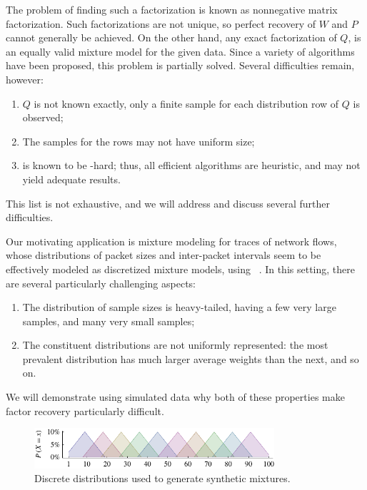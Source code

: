 \documentclass[conference]{IEEEtran}
\begin{document}
The problem of finding such a factorization is known as nonnegative matrix factorization.
Such factorizations are not unique, so perfect recovery of $W$ and $P$ cannot generally be achieved.
On the other hand, any exact factorization of $Q$, is an equally valid mixture model for the given data.
Since a variety of  algorithms have been proposed, this problem is partially solved.
Several difficulties remain, however:
\begin{enumerate}
  \item $Q$ is not known exactly, only a finite sample for each distribution row of $Q$ is observed;
  \item The samples for the rows may not have uniform size;
  \item {} is known to be -hard; thus, all efficient algorithms are heuristic, and may not yield adequate results.
\end{enumerate}
This list is not exhaustive, and we will address and discuss several further difficulties.

Our motivating application is mixture modeling for traces of network flows, whose distributions of packet sizes and inter-packet intervals seem to be effectively modeled as discretized mixture models, using ~\cite{Karpinski08}.
In this setting, there are several particularly challenging aspects:
\begin{enumerate}
  \item The distribution of sample sizes is heavy-tailed, having a few very large samples, and many very small samples;
  \item The constituent distributions are not uniformly represented: the most prevalent distribution has much larger average weights than the next, and so on.
\end{enumerate}
We will demonstrate using simulated data why both of these properties make factor recovery particularly difficult.

\begin{figure}[b]
\begin{center}
\includegraphics[width=3.5in]{synth/test}
\end{center}
\vspace{-0.7em}
\caption{Discrete distributions used to generate synthetic mixtures.}
\vspace{-0.5em}
\end{figure}
\end{document}
